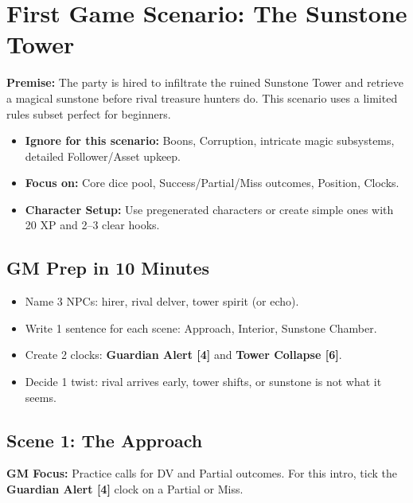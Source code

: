 \section*{First Game Scenario: The Sunstone Tower}
\label{sec:sunstone-tower}

\textbf{Premise:} The party is hired to infiltrate the ruined Sunstone Tower and retrieve a magical sunstone before rival treasure hunters do. This scenario uses a limited rules subset perfect for beginners.

\begin{itemize}
\item \textbf{Ignore for this scenario:} Boons, Corruption, intricate magic subsystems, detailed Follower/Asset upkeep.
\item \textbf{Focus on:} Core dice pool, Success/Partial/Miss outcomes, Position, Clocks.
\item \textbf{Character Setup:} Use pregenerated characters or create simple ones with 20 XP and 2–3 clear hooks.
\end{itemize}

\subsection*{GM Prep in 10 Minutes}
\label{subsec:sunstone-prep}
\begin{tcolorbox}[title=Sunstone Tower Prep Checklist, colback=white!97!gray, colframe=black!80!gray]
\begin{itemize}
\item Name 3 NPCs: hirer, rival delver, tower spirit (or echo).
\item Write 1 sentence for each scene: Approach, Interior, Sunstone Chamber.
\item Create 2 clocks: \textbf{Guardian Alert [4]} and \textbf{Tower Collapse [6]}.
\item Decide 1 twist: rival arrives early, tower shifts, or sunstone is not what it seems.
\end{itemize}
\end{tcolorbox}

\subsection*{Scene 1: The Approach}
\label{subsec:sunstone-approach}
\begin{tcolorbox}[colback=gray!5,colframe=gray!75!black,title=\textbf{Lane Marker: Skill Challenge with a Clock}]
\textbf{GM Focus:} Practice calls for DV and Partial outcomes. For this intro, tick the \textbf{Guardian Alert [4]} clock on a Partial or Miss.
\end{tcolorbox}

